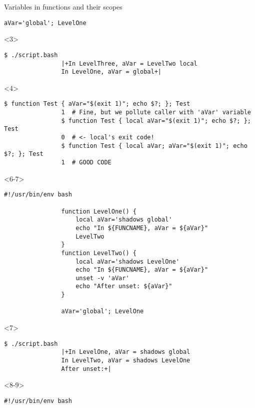 \begin{frame}[fragile]{Variables in functions and their scopes}
\begin{overlayarea}{\textwidth}{0.7\textheight}
\begin{onlyenv}
\begin{lstlisting}[style=MyBash, aboveskip=2mm]
                aVar='global'; LevelOne
            \end{lstlisting}
        \end{onlyenv}
        \begin{onlyenv}<3>
            \begin{lstlisting}[style=MyBash, aboveskip=4pt, numbers=none]
                $ ./script.bash
                |+In LevelThree, aVar = LevelTwo local
                In LevelOne, aVar = global+|
            \end{lstlisting}
        \end{onlyenv}
        \begin{onlyenv}<4>
            \begin{lstlisting}[style=MyBash, style=oddnumbers, aboveskip=2mm, xleftmargin=1mm, xrightmargin=1mm]
                $ function Test { aVar="$(exit 1)"; echo $?; }; Test
                1  # Fine, but we pollute caller with 'aVar' variable
                $ function Test { local aVar="$(exit 1)"; echo $?; }; Test
                0  # <- local's exit code!
                $ function Test { local aVar; aVar="$(exit 1)"; echo $?; }; Test
                1  # GOOD CODE
            \end{lstlisting}
        \end{onlyenv}
        \begin{onlyenv}<6-7>
            \begin{lstlisting}[style=MyBash, aboveskip=2mm]
                #!/usr/bin/env bash

                function LevelOne() {
                    local aVar='shadows global'
                    echo "In ${FUNCNAME}, aVar = ${aVar}"
                    LevelTwo
                }
                function LevelTwo() {
                    local aVar='shadows LevelOne'
                    echo "In ${FUNCNAME}, aVar = ${aVar}"
                    unset -v 'aVar'
                    echo "After unset: ${aVar}"
                }

                aVar='global'; LevelOne
            \end{lstlisting}
        \end{onlyenv}
        \begin{onlyenv}<7>
            \begin{lstlisting}[style=MyBash, aboveskip=4pt, numbers=none]
                $ ./script.bash
                |+In LevelOne, aVar = shadows global
                In LevelTwo, aVar = shadows LevelOne
                After unset:+|
            \end{lstlisting}
        \end{onlyenv}
        \begin{onlyenv}<8-9>
            \begin{lstlisting}[style=MyBash, aboveskip=2mm]
                #!/usr/bin/env bash


\end{lstlisting}
\end{onlyenv}
\end{overlayarea}
\end{frame}
